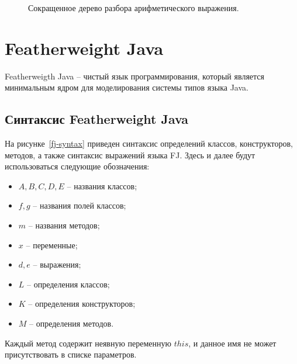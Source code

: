 \begin{figure}
\centering

\caption{Сокращенное дерево разбора арифметического выражения.}
\label{parse-tree-short}
\end{figure}
\section{Featherweight Java}
Featherweigth Java -- чистый язык программирования,
который является минимальным ядром для моделирования системы типов языка Java.
\subsection{Синтаксис Featherweight Java}
На рисунке~\ref{fj-syntax} приведен синтаксис определений классов, конструкторов, методов,
а также синтаксис выражений языка FJ. Здесь и далее будут использоваться следующие обозначения:
\begin{itemize}
    \item $A, B, C, D, E$ -- названия классов;
    \item $f, g$ -- названия полей классов;
    \item $m$ -- названия методов;
    \item $x$ -- переменные;
    \item $d, e$ -- выражения;
    \item $L$ -- определения классов;
    \item $K$ -- определения конструкторов;
    \item $M$ -- определения методов.
\end{itemize}
Каждый метод содержит неявную переменную $this$, и данное имя не может присутствовать в списке параметров.

